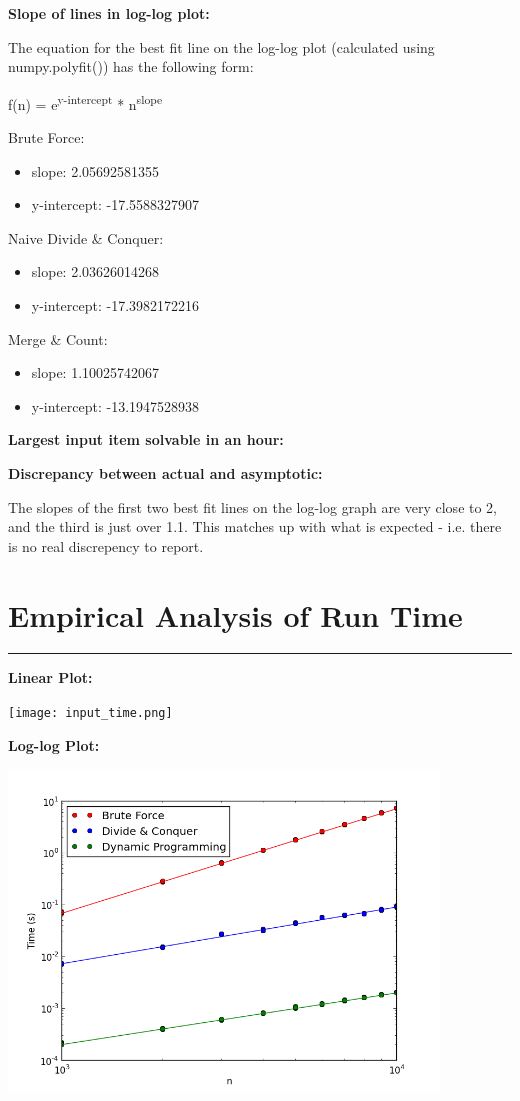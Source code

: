 \documentclass[letterpaper,10pt,titlepage,fleqn]{article}
\begin{document}
\begin{centering}
\textbf{Slope of lines in log-log plot:}
\end{centering}

The equation for the best fit line on the log-log plot (calculated using numpy.polyfit()) has the following form:

f(n) = e\textsuperscript{y-intercept} * n\textsuperscript{slope}

Brute Force:
\begin{itemize}
\item slope: 2.05692581355
\item y-intercept: -17.5588327907
\end{itemize}

Naive Divide \& Conquer:
\begin{itemize}
\item slope: 2.03626014268
\item y-intercept: -17.3982172216
\end{itemize}

Merge \& Count:
\begin{itemize}
\item slope: 1.10025742067
\item y-intercept: -13.1947528938
\end{itemize}

\begin{centering}
\textbf{Largest input item solvable in an hour:}
\end{centering}





\begin{centering}
\textbf{Discrepancy between actual and asymptotic:}
\end{centering}

The slopes of the first two best fit lines on the log-log graph are very close to 2, and the third is just over 1.1. This matches up with what is expected - i.e. there is no real discrepency to report.

\newpage

\section*{Empirical Analysis of Run Time}
\hrule
\textbf{Linear Plot:}
\vskip 0.04in
\begin{center}
\texttt{[image: input\_time.png]}
\end{center}
\textbf{Log-log Plot:}
\vskip 0.04in
\begin{center}
\includegraphics[width=4.5in]{loglog.png}
\end{center}
\end{document}
